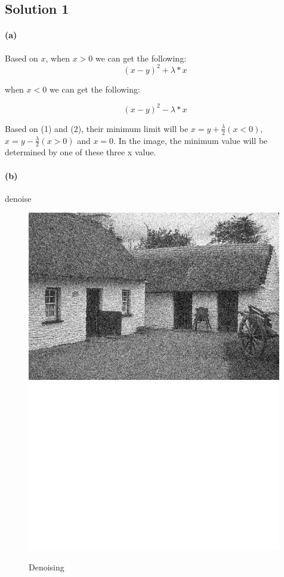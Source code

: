 \documentclass{article}
\newcommand{\solution}[1]{\clearpage \subsection*{Solution #1}}  %
\newcommand{\spart}[1]{\paragraph{(#1)}}
\begin{document}

\solution{1}

\spart{a} 
	Based on $x$, when $x>0$ we can get the following:
\begin{equation}
  	\left(x-y\right)^2 + \lambda*x
\end{equation}

when $x<0$ we can get the following:

\begin{equation}
  	\left(x-y\right)^2 - \lambda*x
\end{equation}

Based on (1) and (2), their minimum limit will be $x = y + \frac{\lambda}{2} (x<0)$, $x = y - \frac{\lambda}{2}  (x>0)$ and $x=0$. In the image, the minimum value will be determined by one of these three x value.

\spart{b} 
	denoise
\begin{figure}[h!]
  \centering
  	\includegraphics[height=20em]{code/inputs/p1.png}
	\includegraphics[height=20em]{code/outputs/prob1.png}
  \caption{Denoising}
\end{figure}
\end{document}
